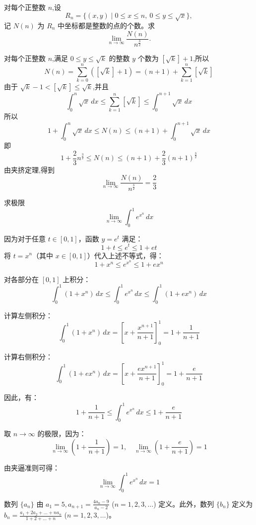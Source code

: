 \begin{questions}
    \question 对每个正整数 $n$,设
    \[
    R_n = \{(x,y) \mid 0 \le x \le n, \ 0 \le y \le \sqrt{x}\},
    \]
    记 $N(n)$ 为 $R_n$ 中坐标都是整数的点的个数。求
    \[
    \lim_{n\to\infty} \frac{N(n)}{n^{\frac{3}{2}}}.
    \]
    \begin{solution}
        对每个正整数 $n$,满足 $0 \le y \le \sqrt{k}$ 的整数 $y$ 个数为 $[\sqrt{k}]+1$,所以
        \[
        N(n) = \sum_{k=0}^{n} ([\sqrt{k}]+1) = (n+1)+\sum_{k=1}^{n} [\sqrt{k}]
        \]
        由于 $\sqrt{k}-1 < [\sqrt{k}] \le \sqrt{k}$,并且
        \[
        \int_{0}^{n} \sqrt{x}\,dx \le \sum_{k=1}^{n} [\sqrt{k}] \le \int_{0}^{n+1} \sqrt{x}\,dx
        \]
        所以
        \[
        1 + \int_{0}^{n} \sqrt{x}\,dx \le N(n) \le (n+1) + \int_{0}^{n+1} \sqrt{x}\,dx
        \]
        即
        \[
        1 + \frac{2}{3} n^{\frac{3}{2}} \le N(n) \le (n+1) + \frac{2}{3} (n+1)^{\frac{3}{2}}
        \]
        由夹挤定理,得到
        \[
        \lim_{n\to\infty} \frac{N(n)}{n^{\frac{3}{2}}} = \frac{2}{3}
        \]
    \end{solution}

    \question
求极限
\[
\lim_{n \to \infty} \int_0^1 e^{x^n} \, dx
\]

\begin{solution}
因为对于任意 $t \in [0, 1]$，函数 $y = e^t$ 满足：
\[
1 + t \le e^t \le 1 + et
\]
将 $t = x^n$（其中 $x \in [0, 1]$）代入上述不等式，得：
\[
1 + x^n \le e^{x^n} \le 1 + ex^n
\]

对各部分在 $[0, 1]$ 上积分：
\[
\int_0^1 (1 + x^n) \, dx \le \int_0^1 e^{x^n} \, dx \le \int_0^1 (1 + ex^n) \, dx
\]

计算左侧积分：
\[
\int_0^1 (1 + x^n) \, dx = \left[ x + \frac{x^{n+1}}{n+1} \right]_0^1 = 1 + \frac{1}{n+1}
\]

计算右侧积分：
\[
\int_0^1 (1 + ex^n) \, dx = \left[ x + \frac{ex^{n+1}}{n+1} \right]_0^1 = 1 + \frac{e}{n+1}
\]

因此，有：
\[
1 + \frac{1}{n+1} \le \int_0^1 e^{x^n} \, dx \le 1 + \frac{e}{n+1}
\]

取 $n \to \infty$ 的极限，因为：
\[
\lim_{n \to \infty} \left( 1 + \frac{1}{n+1} \right) = 1, \quad \lim_{n \to \infty} \left( 1 + \frac{e}{n+1} \right) = 1
\]

由夹逼准则可得：
\[
\lim_{n \to \infty} \int_0^1 e^{x^n} \, dx = 1
\]
\end{solution}

    \question
数列 $\{a_n\}$ 由 $a_1 = 5, a_{n+1} = \frac{4a_n - 9}{a_n - 2}$ ($n = 1, 2, 3, \dots$) 定义。此外，数列 $\{b_n\}$ 定义为 $b_n = \frac{a_1 + 2a_2 + \dots + na_n}{1 + 2 + \dots + n}$ ($n = 1, 2, 3, \dots$)。
\begin{parts}

\end{parts}
\end{questions}
